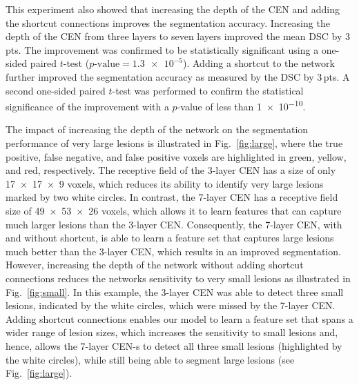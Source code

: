 This experiment also showed that increasing the depth of the CEN
and adding the shortcut connections improves the segmentation accuracy.
Increasing the depth of the CEN from three layers to seven layers improved the
mean DSC by 3\,pts. The improvement was confirmed to be statistically
significant using a one-sided paired $t$-test ($p\text{-value}=\num{1.3e-5}$).
Adding a shortcut to the network further improved the segmentation
accuracy as measured by the DSC by 3\,pts. A second one-sided paired $t$-test
was performed to confirm the statistical significance of the improvement with a
$p$-value of less than \num{1e-10}.

The impact of increasing the depth of the network on the segmentation
performance of very large lesions is illustrated in Fig.~\ref{fig:large}, where
the true positive, false negative, and false positive voxels are highlighted in
green, yellow, and red, respectively. The receptive field of the 3-layer CEN has
a size of only \num{17x17x9} voxels, which reduces its ability to identify very
large lesions marked by two white circles. In contrast, the 7-layer CEN has a
receptive field size of \num{49x53x26} voxels, which allows it to learn features
that can capture much larger lesions than the 3-layer CEN. Consequently, the
7-layer CEN, with and without shortcut, is able to learn a feature set that
captures large lesions much better than the 3-layer CEN, which results in an
improved segmentation. However, increasing the depth of the network without
adding shortcut connections reduces the networks sensitivity to very small
lesions as illustrated in Fig.~\ref{fig:small}. In this example, the 3-layer CEN
was able to detect three small lesions, indicated by the white circles, which
were missed by the 7-layer CEN. Adding shortcut connections enables our model to
learn a feature set that spans a wider range of lesion sizes, which increases
the sensitivity to small lesions and, hence, allows the 7-layer CEN-s to detect
all three small lesions (highlighted by the white circles), while still being
able to segment large lesions (see Fig.~\ref{fig:large}).

